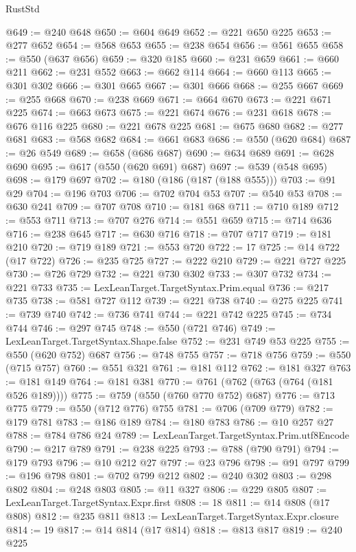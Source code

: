 \begin{lexlean}{RustStd}
\begin{coremodule}
@649 := @240 @648
@650 := @604 @649
@652 := @221 @650 @225
@653 := @277 @652
@654 := @568 @653
@655 := @238 @654
@656 := @561 @655
@658 := @550 (@637 @656)
@659 := @320 @185
@660 := @231 @659
@661 := @660 @211
@662 := @231 @552
@663 := @662 @114
@664 := @660 @113
@665 := @301 @302
@666 := @301 @665
@667 := @301 @666
@668 := @255 @667
@669 := @255 @668
@670 := @238 @669
@671 := @664 @670
@673 := @221 @671 @225
@674 := @663 @673
@675 := @221 @674
@676 := @231 @618
@678 := @676 @116 @225
@680 := @221 @678 @225
@681 := @675 @680
@682 := @277 @681
@683 := @568 @682
@684 := @661 @683
@686 := @550 (@620 @684)
@687 := @26 @549
@689 := @658 (@686 @687)
@690 := @634 @689
@691 := @628 @690
@695 := @617 (@550 (@620 @691) @687)
@697 := @539 (@548 @695)
@698 := @179 @697
@702 := @180 (@186 (@187 (@188 @555)))
@703 := @91 @29
@704 := @196 @703
@706 := @702 @704 @53
@707 := @540 @53
@708 := @630 @241
@709 := @707 @708
@710 := @181 @68
@711 := @710 @189
@712 := @553 @711
@713 := @707 @276
@714 := @551 @659
@715 := @714 @636
@716 := @238 @645
@717 := @630 @716
@718 := @707 @717
@719 := @181 @210
@720 := @719 @189
@721 := @553 @720
@722 := 17
@725 := @14 @722 (@17 @722)
@726 := @235 @725
@727 := @222 @210
@729 := @221 @727 @225
@730 := @726 @729
@732 := @221 @730 @302
@733 := @307 @732
@734 := @221 @733
@735 := LexLeanTarget.TargetSyntax.Prim.equal
@736 := @217 @735
@738 := @581 @727 @112
@739 := @221 @738
@740 := @275 @225
@741 := @739 @740
@742 := @736 @741
@744 := @221 @742 @225
@745 := @734 @744
@746 := @297 @745
@748 := @550 (@721 @746)
@749 := LexLeanTarget.TargetSyntax.Shape.false
@752 := @231 @749 @53 @225
@755 := @550 (@620 @752) @687
@756 := @748 @755
@757 := @718 @756
@759 := @550 (@715 @757)
@760 := @551 @321
@761 := @181 @112
@762 := @181 @327
@763 := @181 @149
@764 := @181 @381
@770 := @761 (@762 (@763 (@764 (@181 @526 @189))))
@775 := @759 (@550 (@760 @770 @752) @687)
@776 := @713 @775
@779 := @550 (@712 @776) @755
@781 := @706 (@709 @779)
@782 := @179 @781
@783 := @186 @189
@784 := @180 @783
@786 := @10 @257 @27
@788 := @784 @786 @24
@789 := LexLeanTarget.TargetSyntax.Prim.utf8Encode
@790 := @217 @789
@791 := @238 @225
@793 := @788 (@790 @791)
@794 := @179 @793
@796 := @10 @212 @27
@797 := @23 @796
@798 := @91 @797
@799 := @196 @798
@801 := @702 @799 @212
@802 := @240 @302
@803 := @298 @802
@804 := @248 @803
@805 := @11 @327
@806 := @229 @805
@807 := LexLeanTarget.TargetSyntax.Expr.first
@808 := 18
@811 := @14 @808 (@17 @808)
@812 := @235 @811
@813 := LexLeanTarget.TargetSyntax.Expr.closure
@814 := 19
@817 := @14 @814 (@17 @814)
@818 := @813 @817
@819 := @240 @225

\end{coremodule}
\end{lexlean}
